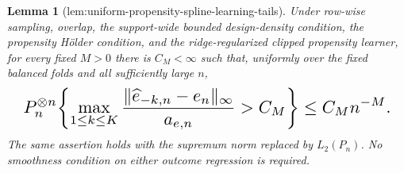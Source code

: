 \documentclass{article}
\newtheorem{lemma}{Lemma}
\begin{document}
\begin{lemma}[lem:uniform-propensity-spline-learning-tails]\label{lem:uniform-propensity-spline-learning-tails}
Under row-wise sampling, overlap, the support-wide bounded design-density condition, the propensity H\"older condition, and the ridge-regularized clipped propensity learner, for every fixed \(M>0\) there is \(C_M<\infty\) such that, uniformly over the fixed balanced folds and all sufficiently large \(n\),
\[
\makebox[\linewidth][c]{\resizebox{0.98\linewidth}{!}{\par\noindent \makebox[\linewidth][c]{\resizebox{0.98\linewidth}{!}{\(\displaystyle \displaystyle P_n^{\otimes n}\!\left\{\max_{1\le k\le K}\frac{\lVert\widehat e_{-k,n}-e_n\rVert_{\infty}}{a_{e,n}}>C_M\right\}\le C_Mn^{-M}.\)}}\par\noindent}}
\]
The same assertion holds with the supremum norm replaced by \(L_2(P_n)\). No smoothness condition on either outcome regression is required.
\end{lemma}
\end{document}
